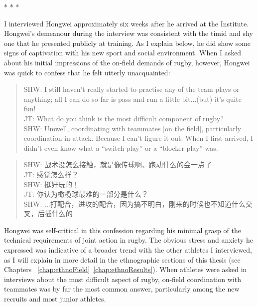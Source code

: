 \begin{CJK}{UTF8}{gbsn}
                            \begin{center}
                                * * *
                            \end{center}

I interviewed Hongwei approximately six weeks after he arrived at the Institute.  Hongwei's demeanour during the interview was consistent with the timid and shy one that he presented publicly at training.  As I explain below, he did show some signs of captivation with his new sport and social environment.  When I asked about his initial impressions of the on-field demands of rugby, however, Hongwei was quick to confess that he felt utterly unacquainted:

  \begin{quote}
    SHW: I still haven't really started to practise any of the team plays or anything; all I can do so far is pass and run a little bit...(but) it's quite fun! \\
    JT: What do you think is the most difficult component of rugby? \\
    SHW: Um\textellipsis well, coordinating with teammates [on the field], particularly coordination in attack.  Because I can't figure it out.  When I first arrived, I didn't even know what a ``switch play'' or a ``blocker play'' was.
  \end{quote}

  \begin{quote}
    SHW: 战术没怎么接触，就是像传球啊、跑动什么的会一点了 \\
    JT: 感觉怎么样？\\
    SHW: 挺好玩的！\\
    JT: 你认为橄榄球最难的一部分是什么？ \\
    SHW: ...打配合，进攻的配合，因为搞不明白，刚来的时候也不知道什么交叉，后插什么的 \\
  \end{quote}

Hongwei was self-critical in this confession regarding his minimal grasp of the technical requirements of joint action in rugby.  The obvious stress and anxiety he expressed was indicative of a broader trend with the other athletes I interviewed, as I will explain in more detail in the ethnographic sections of this thesis (see Chapters ~\ref{chap:ethnoField}\nobreakdash~\ref{chap:ethnoResults}). When athletes were asked in interviews about the most difficult aspect of rugby, on-field coordination with teammates was by far the most common answer, particularly among the new recruits and most junior athletes.


\end{CJK}

